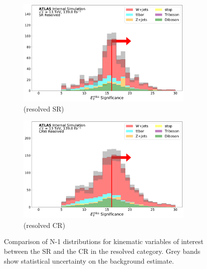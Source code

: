\begin{figure}[htbp]
  \begin{subfigure}{0.45\textwidth}
     \includegraphics[width = 0.95\textwidth]{Figures/App_SR_CR_distributions/SR1L_Resolved/MetTST_Significance_N_1.pdf}
    \caption{\metsig (resolved SR)}
     \end{subfigure}
    \begin{subfigure}{0.45\textwidth}
     \includegraphics[width = 0.95\textwidth]{Figures/App_SR_CR_distributions/CRW_Resolved/MetTST_Significance_N_1.pdf}
     \caption{\metsig (resolved \wjets CR)}
     \end{subfigure}
      \caption[Comparison of N-1 distributions for kinematic variables of interest between the signal region and the \wjets control region in the resolved category.]{Comparison of N-1 distributions for kinematic variables of interest between the SR and the \wjets CR in the resolved category. Grey bands show statistical uncertainty on the background estimate.}
     \label{fig:N_1_CRW_resolved}    
     \end{figure}
     
     \captionsetup[figure]{list=no}
     

